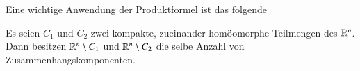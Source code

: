 Eine wichtige Anwendung der Produktformel ist das folgende
\begin{theorem}\label{2.16}
Es seien $C_1$ und $C_2$ zwei kompakte, zueinander homöomorphe Teilmengen des $\mathbb{R}^n$. Dann besitzen
$\mathbb{R}^n\setminus C_1$ und $\mathbb{R}^n\setminus C_2$ die selbe Anzahl von Zusammenhangskomponenten.
\end{theorem}
